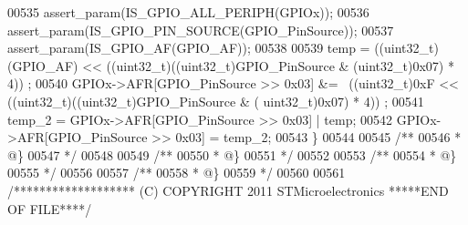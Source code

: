 \begin{DoxyCode}
00535   assert_param(IS\_GPIO\_ALL\_PERIPH(GPIOx));
00536   assert_param(IS\_GPIO\_PIN\_SOURCE(GPIO\_PinSource));
00537   assert_param(IS\_GPIO\_AF(GPIO\_AF));
00538 
00539   temp = ((uint32\_t)(GPIO\_AF) << ((uint32\_t)((uint32\_t)GPIO\_PinSource & (uint32\_t)0x07) * 4)) ;
00540   GPIOx->AFR[GPIO\_PinSource >> 0x03] &= ~((uint32\_t)0xF << ((uint32\_t)((uint32\_t)GPIO\_PinSource & (
      uint32\_t)0x07) * 4)) ;
00541   temp\_2 = GPIOx->AFR[GPIO\_PinSource >> 0x03] | temp;
00542   GPIOx->AFR[GPIO\_PinSource >> 0x03] = temp\_2;
00543 \}
00544 
00545 \textcolor{comment}{/**}
00546 \textcolor{comment}{  * @\}}
00547 \textcolor{comment}{  */}
00548 
00549 \textcolor{comment}{/**}
00550 \textcolor{comment}{  * @\}}
00551 \textcolor{comment}{  */}
00552 
00553 \textcolor{comment}{/**}
00554 \textcolor{comment}{  * @\}}
00555 \textcolor{comment}{  */}
00556 
00557 \textcolor{comment}{/**}
00558 \textcolor{comment}{  * @\}}
00559 \textcolor{comment}{  */}
00560 
00561 \textcolor{comment}{/******************* (C) COPYRIGHT 2011 STMicroelectronics *****END OF FILE****/}
\end{DoxyCode}
